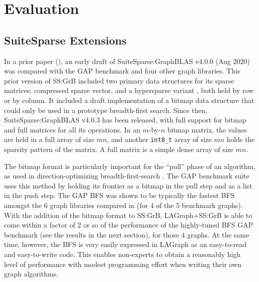 \section{Evaluation}
\label{sec:evaluation}


\subsection{SuiteSparse Extensions}


In a prior paper (\cite{DBLP:conf/iiswc/AzadABBCDDDDFGG20}), an early draft of
SuiteSparse:GraphBLAS v4.0.0 (Aug 2020) was compared with the GAP benchmark
\cite{DBLP:conf/sc/BeamerAP12} and four other graph libraries.  This prior
version of SS:GrB included two primary data structures for its sparse matrices:
compressed sparse vector, and a hypersparse variant
\cite{DBLP:conf/ipps/BulucG08}, both held by row or by column.  It included a
draft implementation of a bitmap data structure that could only be used in a
prototype breadth-first search.  Since then, SuiteSparse:GraphBLAS v4.0.3 has
been released, with full support for bitmap and full matrices for all its
operations.  In an $m$-by-$n$ bitmap matrix, the values are held in a full
array of size $mn$, and another \verb'int8_t' array of size $mn$ holds the
sparsity pattern of the matrix.  A full matrix is a simple dense array of size
$mn$.

The bitmap format is particularly important for the ``pull'' phase of an
algorithm, as used in direction-optimizing breadth-first-search
\cite{DBLP:conf/sc/BeamerAP12}.  The GAP benchmark suite uses this method by
holding its frontier as a bitmap in the pull step and as a list in the push
step. The GAP BFS was shown to be typically the fastest BFS amongst the 6 graph
libraries compared in \cite{DBLP:conf/iiswc/AzadABBCDDDDFGG20} (for 4 of the 5
benchmark graphs).  With the addition of the bitmap format to SS:GrB,
LAGraph+SS:GrB is able to come within a factor of 2 or so of the performance of
the highly-tuned BFS GAP benchmark (see the results in the next section), for
those 4 graphs.  At the same time, however, the BFS is very easily expressed in
LAGraph as an easy-to-read and easy-to-write code.  This enables non-experts to
obtain a reasonably high level of performance with modest programming effort
when writing their own graph algorithms.


